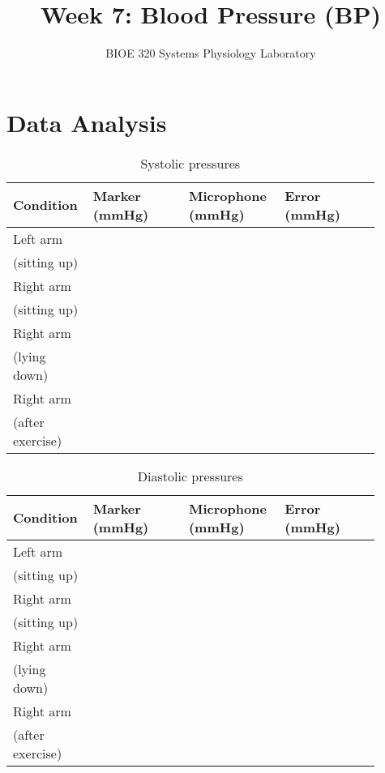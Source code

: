 \documentclass{article}
\title{Week 7: Blood Pressure (BP)}
\author{BIOE 320 Systems Physiology Laboratory}
\date{}
\begin{document}
\large
\maketitle

\section*{Data Analysis}
\begin{itemize}

	\begin{table}[h]
	\centering
	\caption{Systolic pressures}
	\begin{tabular}[h!]{p{0.15\linewidth}|p{0.25\linewidth}p{0.25\linewidth}p{0.25\linewidth}}
	\toprule
	Condition & Marker (mmHg) & Microphone (mmHg) & Error (mmHg)\\
	\midrule
	Left arm & & &\\(sitting up) & & &\\\midrule
	Right arm & & &\\(sitting up) & & &\\\midrule
	Right arm & & &\\(lying down) & & &\\\midrule
	Right arm & & &\\(after exercise) & & &\\
	\bottomrule
	\end{tabular}
	\end{table}\vspace{1cm}

	\begin{table}[h]
	\centering
	\caption{Diastolic pressures}
	\begin{tabular}[h!]{p{0.15\linewidth}|p{0.25\linewidth}p{0.25\linewidth}p{0.25\linewidth}}
	\toprule
	Condition & Marker (mmHg) & Microphone (mmHg) & Error (mmHg)\\
	\midrule
	Left arm & & &\\(sitting up) & & &\\\midrule
	Right arm & & &\\(sitting up) & & &\\\midrule
	Right arm & & &\\(lying down) & & &\\\midrule
	Right arm & & &\\(after exercise) & & &\\
	\bottomrule
	\end{tabular}
	\end{table}\vspace{0.5cm}


\end{itemize}
\end{document}

